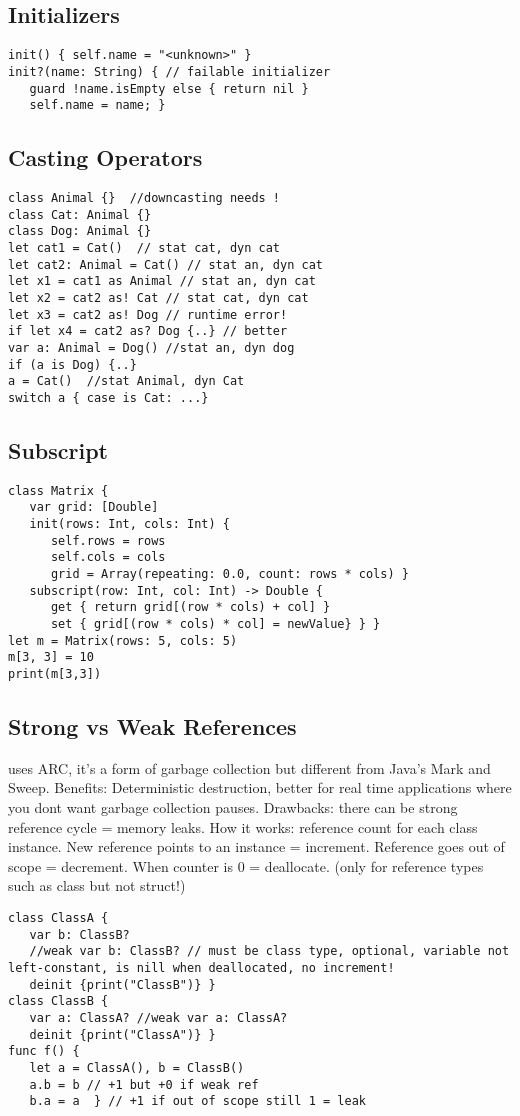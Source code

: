 \subsection{Initializers}
\begin{lstlisting}
init() { self.name = "<unknown>" }
init?(name: String) { // failable initializer
   guard !name.isEmpty else { return nil }
   self.name = name; }
\end{lstlisting}

\subsection{Casting Operators}
\begin{lstlisting}
class Animal {}  //downcasting needs !
class Cat: Animal {}
class Dog: Animal {}
let cat1 = Cat()  // stat cat, dyn cat
let cat2: Animal = Cat() // stat an, dyn cat
let x1 = cat1 as Animal // stat an, dyn cat
let x2 = cat2 as! Cat // stat cat, dyn cat
let x3 = cat2 as! Dog // runtime error!
if let x4 = cat2 as? Dog {..} // better
var a: Animal = Dog() //stat an, dyn dog
if (a is Dog) {..}
a = Cat()  //stat Animal, dyn Cat
switch a { case is Cat: ...}
\end{lstlisting}

\subsection{Subscript}
\begin{lstlisting}
class Matrix {
   var grid: [Double]
   init(rows: Int, cols: Int) {
      self.rows = rows
      self.cols = cols
      grid = Array(repeating: 0.0, count: rows * cols) }
   subscript(row: Int, col: Int) -> Double {
      get { return grid[(row * cols) + col] }
      set { grid[(row * cols) * col] = newValue} } }
let m = Matrix(rows: 5, cols: 5)
m[3, 3] = 10
print(m[3,3])
\end{lstlisting}

\subsection{Strong vs Weak References}
uses ARC, it's a form of garbage collection but different from Java's Mark and Sweep. Benefits: Deterministic destruction, better for real time applications where you dont want garbage collection pauses. Drawbacks: there can be strong reference cycle = memory leaks.
How it works: reference count for each class instance. New reference points to an instance = increment. Reference goes out of scope = decrement. When counter is 0 = deallocate. (only for reference types such as class but not struct!)
\begin{lstlisting}
class ClassA {
   var b: ClassB?
   //weak var b: ClassB? // must be class type, optional, variable not left-constant, is nill when deallocated, no increment!
   deinit {print("ClassB")} }
class ClassB {
   var a: ClassA? //weak var a: ClassA?
   deinit {print("ClassA")} }
func f() {
   let a = ClassA(), b = ClassB()
   a.b = b // +1 but +0 if weak ref
   b.a = a  } // +1 if out of scope still 1 = leak
\end{lstlisting}


